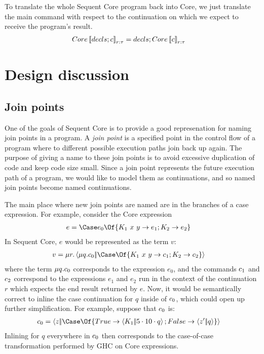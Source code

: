 \documentclass{article}
\begin{document}
To translate the whole Sequent Core program back into Core, we just translate
the main command with respect to the continuation on which we expect to receive
the program's result.
\begin{align*}
  Core\left\llbracket{decls; c}\right\rrbracket_{r:\tau} &= decls; Core\left\llbracket{c}\right\rrbracket_{r:\tau}
\end{align*}

\section{Design discussion}
\label{sec:design-discussion}

\subsection{Join points}

One of the goals of Sequent Core is to provide a good represenation for naming
join points in a program.  A \emph{join point} is a specified point in the
control flow of a program where to different possible execution paths join back
up again.  The purpose of giving a name to these join points is to avoid
excessive duplication of code and keep code size small.  Since a join point
represents the future execution path of a program, we would like to model them
as continuations, and so named join points become named continuations.

The main place where new join points are named are in the branches of a case
expression.  For example, consider the Core expression
\begin{align*}
  e &= \Case e_0 \Of \{ K_1 ~ x ~ y \to e_1; K_2 \to e_2 \}
\end{align*}
In Sequent Core, $e$ would be represented as the term $v$:
\begin{align*}
  v
  &=
  \comp{r}
    \cut
    {\comp{q}\com_0}
    {\Case\Of \{ K_1 ~ x ~ y \to \com_1; K_2 \to \com_2 \}}
\end{align*}
where the term $\mu{q}.c_0$ corresponds to the expression $e_0$, and the
commands $c_1$ and $c_2$ correspond to the expressions $e_1$ and $e_2$ run
in the context of the continuation $r$ which expects the end result returned by
$e$.  Now, it would be semantically correct to inline the case continuation for
$q$ inside of $c_0$, which could open up further simplification.  For
example, suppose that $c_0$ is:
\begin{align*}
  \com_0
  &=
  \cut{z}{\Case\Of \{ True \to \cut{K_1}{\app{5}{\app{10}{q}}}; False \to \cut{z'}{q} \}}
\end{align*}
Inlining for $q$ everywhere in $c_0$ then corresponds to the case-of-case
transformation performed by GHC on Core expressions.
\end{document}
